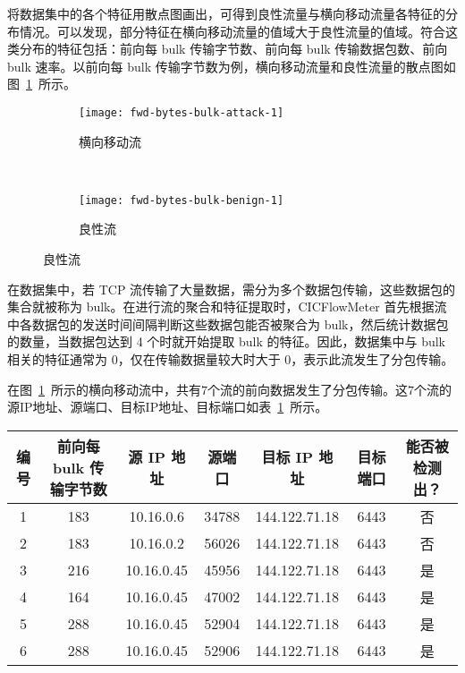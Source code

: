 {将数据集中的各个特征用散点图画出，可得到良性流量与横向移动流量各特征的分布情况。可以发现，部分特征在横向移动流量的值域大于良性流量的值域。符合这类分布的特征包括：前向每 bulk 传输字节数、前向每 bulk 传输数据包数、前向 bulk 速率。以前向每 bulk 传输字节数为例，横向移动流量和良性流量的散点图如图~\ref{fig:flow-bytes-bulk-avg}~所示。

\begin{figure}[!htbp]
    \centering
    \begin{subfigure}[b]{0.48\textwidth}
      \texttt{[image: fwd-bytes-bulk-attack-1]}
      \caption{横向移动流}
    \end{subfigure}%
    ~%
    \begin{subfigure}[b]{0.48\textwidth}
      \texttt{[image: fwd-bytes-bulk-benign-1]}
      \caption{良性流}
    \end{subfigure}
    \label{fig:flow-bytes-bulk-avg}
\end{figure}

在数据集中，若 TCP 流传输了大量数据，需分为多个数据包传输，这些数据包的集合就被称为 bulk。在进行流的聚合和特征提取时，CICFlowMeter 首先根据流中各数据包的发送时间间隔判断这些数据包能否被聚合为 bulk，然后统计数据包的数量，当数据包达到 4 个时就开始提取 bulk 的特征。因此，数据集中与 bulk 相关的特征通常为 $0$，仅在传输数据量较大时大于 $0$，表示此流发生了分包传输。

在图~\ref{fig:flow-bytes-bulk-avg}~所示的横向移动流中，共有$7$个流的前向数据发生了分包传输。这$7$个流的源IP地址、源端口、目标IP地址、目标端口如表~\ref{tab:dataset-malicious-bulks}~所示。

\begin{table}[!htbp]
    \label{tab:dataset-malicious-bulks}
    \centering
    \footnotesize%
    \setlength{\tabcolsep}{4pt}%
    \renewcommand{\arraystretch}{1.2}%
    \begin{tabular}{ccccccc}
        \hline
        编号 & 前向每 bulk 传输字节数 & 源 IP 地址 & 源端口 & 目标 IP 地址 & 目标端口 & 能否被检测出？\\
        \hline
        1 & 183 & 10.16.0.6 & 34788 & 144.122.71.18 & 6443 & 否\\
        2 & 183 & 10.16.0.2 & 56026 & 144.122.71.18 & 6443 & 否\\
        3 & 216 & 10.16.0.45 & 45956 & 144.122.71.18 & 6443 & 是\\
        4 & 164 & 10.16.0.45 & 47002 & 144.122.71.18 & 6443 & 是\\
        5 & 288 & 10.16.0.45 & 52904 & 144.122.71.18 & 6443 & 是\\
        6 & 288 & 10.16.0.45 & 52906 & 144.122.71.18 & 6443 & 是\\
        \hline
    \end{tabular}
\end{table}

}
